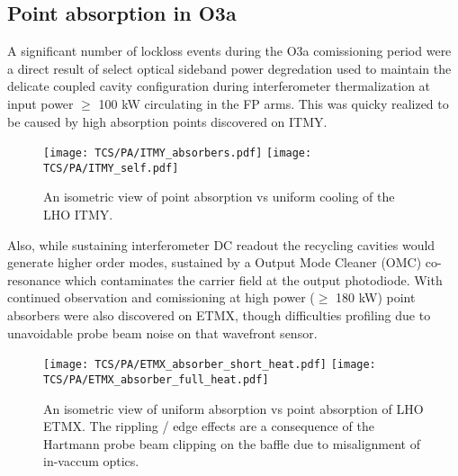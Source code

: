 
\subsection{Point absorption in O3a}
A significant number of lockloss events during the O3a comissioning period were a direct result of select optical sideband power degredation used to maintain the delicate coupled cavity configuration during interferometer thermalization at input power $\geq$ 100 kW circulating in the FP arms. This was quicky realized to be caused by high absorption points discovered on ITMY.  
\begin{figure}[H]
  \centering
  \begin{subcaptiongroup}
	  \texttt{[image: TCS/PA/ITMY\_absorbers.pdf]}
	  \label{subfig:itmypajustself}
	  \texttt{[image: TCS/PA/ITMY\_self.pdf]}
	  \label{subfig:itmypaselfplusabs}
  \end{subcaptiongroup}
  \captionsetup{subrefformat=parens}
  \vspace{-19mm}
  \caption{An isometric view of point absorption vs uniform cooling of the LHO ITMY.}
  \label{fig:ITMYpabs}
\end{figure}

Also, while sustaining interferometer DC readout the recycling cavities would generate higher order modes, sustained by a Output Mode Cleaner (OMC) co-resonance which contaminates the carrier field at the output photodiode. With continued observation and comissioning at high power ($\geq$ 180 kW) point absorbers were also discovered on ETMX, though difficulties profiling due to unavoidable probe beam noise on that wavefront sensor.

\begin{figure}[H]
  \centering
  \begin{subcaptiongroup}
	  \texttt{[image: TCS/PA/ETMX\_absorber\_short\_heat.pdf]}
	  \label{subfig:etmxpajustself}
	  \texttt{[image: TCS/PA/ETMX\_absorber\_full\_heat.pdf]}
	  \label{subfig:etmxpaselfplusabs}
  \end{subcaptiongroup}
  \captionsetup{subrefformat=parens}
  \vspace{-19mm}
  \caption{An isometric view of uniform absorption vs point absorption of LHO ETMX. The rippling / edge effects are a consequence of the Hartmann probe beam clipping on the baffle due to misalignment of in-vaccum optics.}
  \label{fig:ETMXpabs}
\end{figure}

